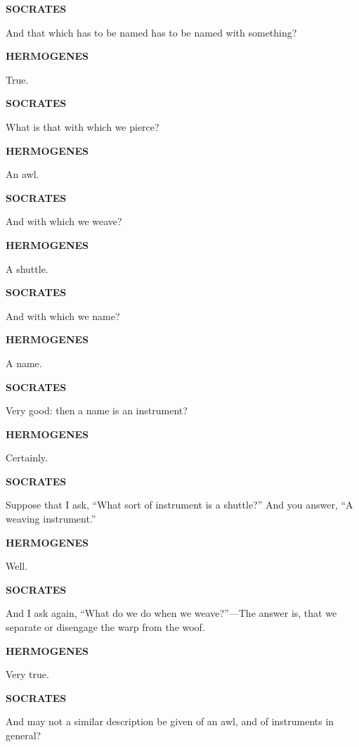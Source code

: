 \documentclass[11pt,letter]{article}
\begin{document}
\par \textbf{SOCRATES}
\par   And that which has to be named has to be named with something?

\par \textbf{HERMOGENES}
\par   True.

\par \textbf{SOCRATES}
\par   What is that with which we pierce?

\par \textbf{HERMOGENES}
\par   An awl.

\par \textbf{SOCRATES}
\par   And with which we weave?

\par \textbf{HERMOGENES}
\par   A shuttle.

\par \textbf{SOCRATES}
\par   And with which we name?

\par \textbf{HERMOGENES}
\par   A name.

\par \textbf{SOCRATES}
\par   Very good:  then a name is an instrument?

\par \textbf{HERMOGENES}
\par   Certainly.

\par \textbf{SOCRATES}
\par   Suppose that I ask, “What sort of instrument is a shuttle?” And you answer, “A weaving instrument.”

\par \textbf{HERMOGENES}
\par   Well.

\par \textbf{SOCRATES}
\par   And I ask again, “What do we do when we weave?”—The answer is, that we separate or disengage the warp from the woof.

\par \textbf{HERMOGENES}
\par   Very true.

\par \textbf{SOCRATES}
\par   And may not a similar description be given of an awl, and of instruments in general?
\end{document}
